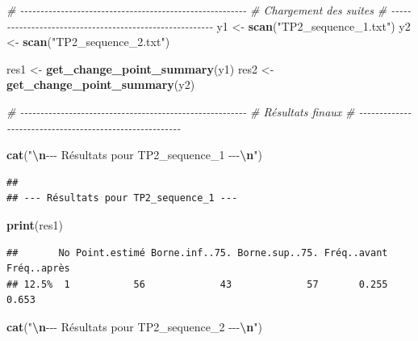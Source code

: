 \documentclass[
]{article}
\newenvironment{Shaded}{\begin{snugshade}}{\end{snugshade}}
\newcommand{\CommentTok}[1]{\textcolor[rgb]{0.56,0.35,0.01}{\textit{#1}}}
\newcommand{\FunctionTok}[1]{\textcolor[rgb]{0.13,0.29,0.53}{\textbf{#1}}}
\newcommand{\NormalTok}[1]{#1}
\newcommand{\OtherTok}[1]{\textcolor[rgb]{0.56,0.35,0.01}{#1}}
\newcommand{\SpecialCharTok}[1]{\textcolor[rgb]{0.81,0.36,0.00}{\textbf{#1}}}
\newcommand{\StringTok}[1]{\textcolor[rgb]{0.31,0.60,0.02}{#1}}
\begin{document}
\begin{Shaded}
\begin{Highlighting}[]
\CommentTok{\# {-}{-}{-}{-}{-}{-}{-}{-}{-}{-}{-}{-}{-}{-}{-}{-}{-}{-}{-}{-}{-}{-}{-}{-}{-}{-}{-}{-}{-}{-}{-}{-}{-}{-}{-}{-}{-}{-}{-}{-}{-}{-}{-}{-}{-}{-}{-}{-}{-}{-}{-}{-}{-}{-}{-}{-}}
\CommentTok{\# Chargement des suites }
\CommentTok{\# {-}{-}{-}{-}{-}{-}{-}{-}{-}{-}{-}{-}{-}{-}{-}{-}{-}{-}{-}{-}{-}{-}{-}{-}{-}{-}{-}{-}{-}{-}{-}{-}{-}{-}{-}{-}{-}{-}{-}{-}{-}{-}{-}{-}{-}{-}{-}{-}{-}{-}{-}{-}{-}{-}{-}{-}}
\NormalTok{y1 }\OtherTok{\textless{}{-}} \FunctionTok{scan}\NormalTok{(}\StringTok{"TP2\_sequence\_1.txt"}\NormalTok{)}
\NormalTok{y2 }\OtherTok{\textless{}{-}} \FunctionTok{scan}\NormalTok{(}\StringTok{"TP2\_sequence\_2.txt"}\NormalTok{)}

\NormalTok{res1 }\OtherTok{\textless{}{-}} \FunctionTok{get\_change\_point\_summary}\NormalTok{(y1)}
\NormalTok{res2 }\OtherTok{\textless{}{-}} \FunctionTok{get\_change\_point\_summary}\NormalTok{(y2)}

\CommentTok{\# {-}{-}{-}{-}{-}{-}{-}{-}{-}{-}{-}{-}{-}{-}{-}{-}{-}{-}{-}{-}{-}{-}{-}{-}{-}{-}{-}{-}{-}{-}{-}{-}{-}{-}{-}{-}{-}{-}{-}{-}{-}{-}{-}{-}{-}{-}{-}{-}{-}{-}{-}{-}{-}{-}{-}{-}}
\CommentTok{\# Résultats finaux}
\CommentTok{\# {-}{-}{-}{-}{-}{-}{-}{-}{-}{-}{-}{-}{-}{-}{-}{-}{-}{-}{-}{-}{-}{-}{-}{-}{-}{-}{-}{-}{-}{-}{-}{-}{-}{-}{-}{-}{-}{-}{-}{-}{-}{-}{-}{-}{-}{-}{-}{-}{-}{-}{-}{-}{-}{-}{-}{-}}

\FunctionTok{cat}\NormalTok{(}\StringTok{"}\SpecialCharTok{\textbackslash{}n}\StringTok{{-}{-}{-} Résultats pour TP2\_sequence\_1 {-}{-}{-}}\SpecialCharTok{\textbackslash{}n}\StringTok{"}\NormalTok{)}
\end{Highlighting}
\end{Shaded}

\begin{verbatim}
## 
## --- Résultats pour TP2_sequence_1 ---
\end{verbatim}

\begin{Shaded}
\begin{Highlighting}[]
\FunctionTok{print}\NormalTok{(res1)}
\end{Highlighting}
\end{Shaded}

\begin{verbatim}
##       No Point.estimé Borne.inf..75. Borne.sup..75. Fréq..avant Fréq..après
## 12.5%  1           56             43             57       0.255       0.653
\end{verbatim}

\begin{Shaded}
\begin{Highlighting}[]
\FunctionTok{cat}\NormalTok{(}\StringTok{"}\SpecialCharTok{\textbackslash{}n}\StringTok{{-}{-}{-} Résultats pour TP2\_sequence\_2 {-}{-}{-}}\SpecialCharTok{\textbackslash{}n}\StringTok{"}\NormalTok{)}
\end{Highlighting}
\end{Shaded}
\end{document}
